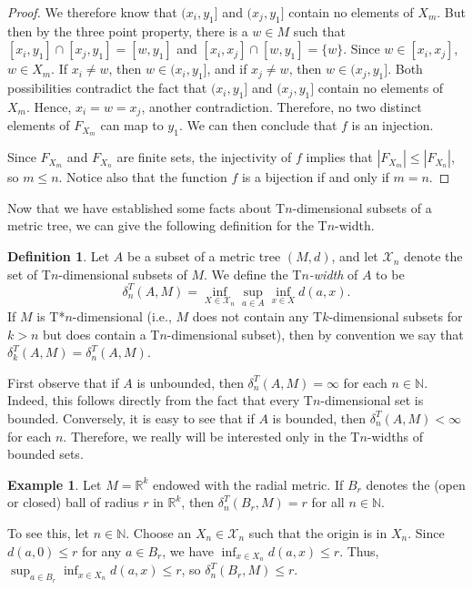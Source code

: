 \documentclass{bcp92}
\theoremstyle{plain}
\theoremstyle{definition}
\newtheorem{defi}[thm]{Definition}
\newtheorem{exm}[thm]{Example}
\begin{document}
\begin{proof}
We therefore know that $(x_i,y_1]$ and $(x_j,y_1]$ contain no elements of
$X_m$. But then by the three point property, there is a $w \in M$ such that
$[x_i,y_1] \cap [x_j,y_1] = [w,y_1]$ and $[x_i,x_j] \cap [w,y_1] = \{ w \}$.
Since $w \in [x_i,x_j]$, $w \in X_m$. If $x_i \neq w$, then $w \in
(x_i,y_1]$, and if $x_j \neq w$, then $w \in (x_j,y_1]$. Both possibilities
contradict the fact that $(x_i,y_1]$ and $(x_j,y_1]$ contain no elements of
$X_m$. Hence, $x_i = w = x_j$, another contradiction. Therefore, no two
distinct elements of $F_{X_m}$ can map to $y_1$. We can then conclude that
$f$ is an injection.

Since $F_{X_m}$ and $F_{X_n}$ are finite sets, the injectivity of $f$ implies
that $| F_{X_m} | \leq | F_{X_n} |$, so $m \leq n$. Notice also that the
function $f$ is a bijection if and only if $m = n$.
\end{proof}

Now that we have established some facts about T$n$-dimensional subsets of a
metric tree, we can give the following definition for the T$n$-width.

\begin{defi}
Let $A$ be a subset of a metric tree $(M,d)$, and let $\mathcal{X}_n$ denote
the set of T$n$-dimensional subsets of $M$. We define the T\textit{$n$-width}
of $A$ to be
$$
\delta_n^T(A,M) = \inf_{X \in \mathcal{X}_n} \sup_{a \in A}
\inf_{x \in X} d(a,x).
$$
If $M$ is T*$n$-dimensional (i.e., $M$ does not
contain any T$k$-dimensional subsets for $k > n$ but does contain a
T$n$-dimensional subset), then by convention we say that $\delta_k^T(A,M) =
\delta_n^T(A,M)$.
\end{defi}

First observe that if $A$ is unbounded, then $\delta_n^T(A,M) = \infty$ for
each $n \in \mathbb{N}$. Indeed, this follows directly from the fact that
every T$n$-dimensional set is bounded. Conversely, it is easy to see that if
$A$ is bounded, then $\delta_n^T(A,M) < \infty$ for each $n$. Therefore, we
really will be interested only in the T$n$-widths of bounded sets.

\begin{exm}
Let $M = \mathbb{R}^k$ endowed with the radial metric. If $B_r$ denotes the
(open or closed) ball of radius $r$ in $\mathbb{R}^k$, then
$\delta_n^T(B_r,M) = r$ for all $n \in \mathbb{N}$.
\end{exm}

To see this, let $n \in \mathbb{N}$. Choose an $X_n \in \mathcal{X}_n$ such
that the origin is in $X_n$. Since $d(a,0) \leq r$ for any $a \in B_r$, we
have $\inf_{x \in X_n} d(a,x) \leq r$. Thus, $\sup_{a \in B_r} \inf_{x \in
X_n} d(a,x) \leq r$, so $\delta_n^T(B_r,M) \leq r$.
\end{document}
